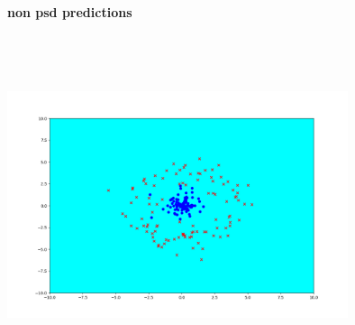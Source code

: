 \begin{answer}
\begin{figure}[H]
	\textbf{non psd predictions}\par\medskip
	\includegraphics[width=10cm,height=10cm,keepaspectratio]{../src/perceptron/perceptron_non_psd_output.png}
\end{figure}

\end{answer}
